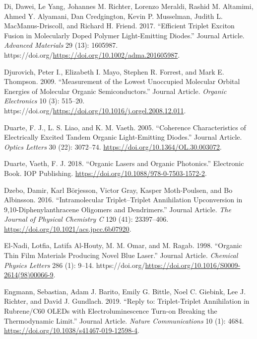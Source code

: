 \documentclass[
  letterpaper,
  DIV=11,
  numbers=noendperiod,
  oneside]{scrreprt}
\newlength{\cslhangindent}
\newlength{\cslentryspacingunit} %
\newenvironment{CSLReferences}[2] %
 {%
  \setlength{\parindent}{0pt}
  \ifodd #1
  \let\oldpar\par
  \def\par{\hangindent=\cslhangindent\oldpar}
  \fi
  \setlength{\parskip}{#2\cslentryspacingunit}
 }%
 {}
\begin{document}
\begin{CSLReferences}{1}{0}
\leavevmode{}%
Di, Dawei, Le Yang, Johannes M. Richter, Lorenzo Meraldi, Rashid M.
Altamimi, Ahmed Y. Alyamani, Dan Credgington, Kevin P. Musselman, Judith
L. MacManus-Driscoll, and Richard H. Friend. 2017. {``Efficient Triplet
Exciton Fusion in Molecularly Doped Polymer Light-Emitting Diodes.''}
Journal Article. \emph{Advanced Materials} 29 (13): 1605987.
https://doi.org/\url{https://doi.org/10.1002/adma.201605987}.

\leavevmode{}%
Djurovich, Peter I., Elizabeth I. Mayo, Stephen R. Forrest, and Mark E.
Thompson. 2009. {``Measurement of the Lowest Unoccupied Molecular
Orbital Energies of Molecular Organic Semiconductors.''} Journal
Article. \emph{Organic Electronics} 10 (3): 515--20.
https://doi.org/\url{https://doi.org/10.1016/j.orgel.2008.12.011}.

\leavevmode{}%
Duarte, F. J., L. S. Liao, and K. M. Vaeth. 2005. {``Coherence
Characteristics of Electrically Excited Tandem Organic Light-Emitting
Diodes.''} Journal Article. \emph{Optics Letters} 30 (22): 3072--74.
\url{https://doi.org/10.1364/OL.30.003072}.

\leavevmode{}%
Duarte, Vaeth, F. J. 2018. {``Organic Lasers and Organic Photonics.''}
Electronic Book. IOP Publishing.
\url{https://doi.org/10.1088/978-0-7503-1572-2}.

\leavevmode{}%
Dzebo, Damir, Karl Börjesson, Victor Gray, Kasper Moth-Poulsen, and Bo
Albinsson. 2016. {``Intramolecular Triplet--Triplet Annihilation
Upconversion in 9,10-Diphenylanthracene Oligomers and Dendrimers.''}
Journal Article. \emph{The Journal of Physical Chemistry C} 120 (41):
23397--406. \url{https://doi.org/10.1021/acs.jpcc.6b07920}.

\leavevmode{}%
El-Nadi, Lotfia, Latifa Al-Houty, M. M. Omar, and M. Ragab. 1998.
{``Organic Thin Film Materials Producing Novel Blue Laser.''} Journal
Article. \emph{Chemical Physics Letters} 286 (1): 9--14.
https://doi.org/\url{https://doi.org/10.1016/S0009-2614(98)00066-9}.

\leavevmode{}%
Engmann, Sebastian, Adam J. Barito, Emily G. Bittle, Noel C. Giebink,
Lee J. Richter, and David J. Gundlach. 2019. {``Reply to:
Triplet-Triplet Annihilation in Rubrene/C60 OLEDs with
Electroluminescence Turn-on Breaking the Thermodynamic Limit.''} Journal
Article. \emph{Nature Communications} 10 (1): 4684.
\url{https://doi.org/10.1038/s41467-019-12598-4}.


\end{CSLReferences}
\end{document}
